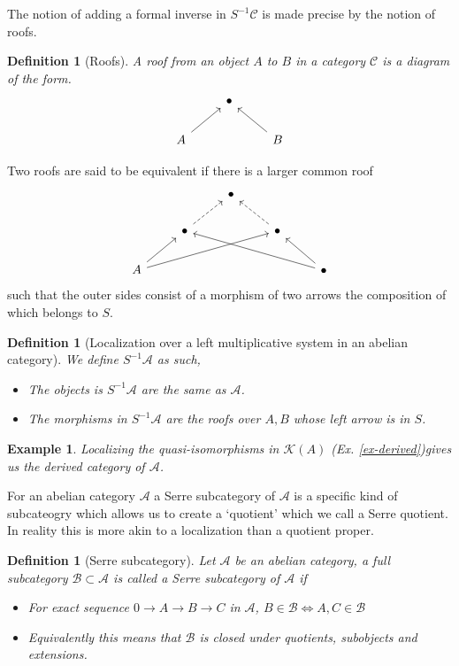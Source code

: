 \documentclass[12pt]{article}
\numberwithin{equation}{section}
\newcounter{dummy} \numberwithin{dummy}{section}
\newtheorem{definition}[dummy]{Definition}
\newtheorem{example}[dummy]{Example}
\begin{document}
		The notion of adding a formal inverse in $S^{-1}\mathcal{C}$ is made precise by the notion of roofs.
		\begin{definition}[Roofs]
			A roof from an object $A$ to $B$ in a category $\mathcal{C}$ is a diagram of the form.
			\[\begin{tikzcd}
				& \bullet \\
				A && B
				\arrow[from=2-1, to=1-2]
				\arrow[from=2-3, to=1-2]
			\end{tikzcd}\]
		\end{definition}
		Two roofs are said to be equivalent if there is a larger common roof 
		\[\begin{tikzcd}
			&& \bullet \\
			& \bullet && \bullet \\
			A &&&& \bullet
			\arrow[dashed, from=2-2, to=1-3]
			\arrow[dashed, from=2-4, to=1-3]
			\arrow[from=3-1, to=2-2]
			\arrow[from=3-1, to=2-4]
			\arrow[from=3-5, to=2-2]
			\arrow[from=3-5, to=2-4]
		\end{tikzcd}\]
		such that the outer sides consist of a morphism of two arrows the composition of which belongs to $S$.
		
		\begin{definition}[Localization over a left multiplicative system in an abelian category]
			We define $S^{-1} \mathcal{A}$ as such,
			\begin{itemize}
				\item The objects is $S^{-1} \mathcal{A}$ are the same as $\mathcal{A}$.
				\item The morphisms in $S^{-1} \mathcal{A}$ are the roofs over $A, B$ whose left arrow is in $S$.
			\end{itemize}
			
		\end{definition}
		
		\begin{example}
			Localizing the quasi-isomorphisms in $\mathcal{K}(A)$ (Ex. \ref{ex-derived})gives us the derived category of $\mathcal{A}$.
		\end{example}
		For an abelian category $\mathcal{A}$ a Serre subcategory of $\mathcal{A}$ is a specific kind of subcateogry which allows us to create a `quotient' which we call a Serre quotient. In reality this is more akin to a localization than a quotient proper. 
	
	\begin{definition}[Serre subcategory]
		Let $\mathcal{A}$ be an abelian category, a full subcategory $\mathcal{B} \subset \mathcal{A}$ is called a Serre subcategory of $\mathcal{A}$ if \begin{itemize}
			\item For exact sequence $0 \to A \to B \to C $ in $\mathcal{A}$, $B \in \mathcal{B} \iff A,C \in \mathcal{B}$
			\item Equivalently this means that $\mathcal{B}$ is closed under quotients, subobjects and extensions.
		\end{itemize}
	\end{definition}
	
\end{document}
